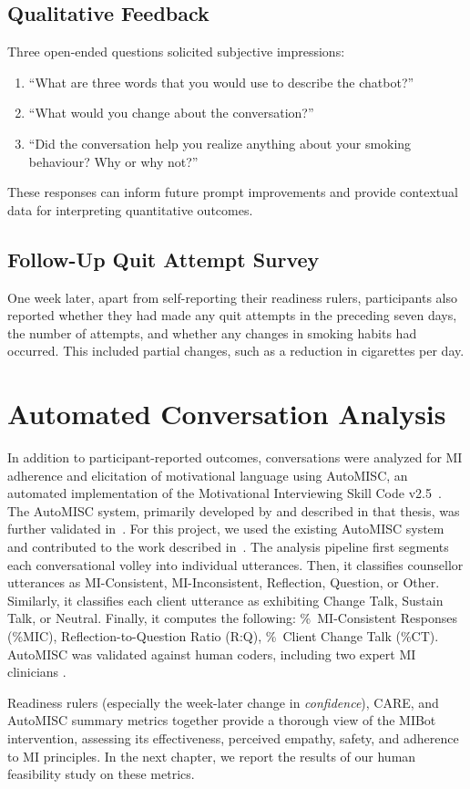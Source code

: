 \subsection{Qualitative Feedback}
Three open-ended questions solicited subjective impressions:
\begin{enumerate}
    \item ``What are three words that you would use to describe the chatbot?''
    \item ``What would you change about the conversation?''
    \item ``Did the conversation help you realize anything about your smoking behaviour? Why or why not?''
\end{enumerate}
These responses can inform future prompt improvements and provide contextual data for interpreting quantitative outcomes.

\subsection{Follow-Up Quit Attempt Survey}
One week later, apart from self-reporting their readiness rulers, participants also reported whether they had made any quit attempts in the preceding seven days, the number of attempts, and whether any changes in smoking habits had occurred. This included partial changes, such as a reduction in cigarettes per day.

\section{Automated Conversation Analysis}
\label{subsec:automisc}
In addition to participant-reported outcomes, conversations were analyzed for MI adherence and elicitation of motivational language using AutoMISC, an automated implementation of the Motivational Interviewing Skill Code v2.5~\citep{Houck2010}. The AutoMISC system, primarily developed by \citet{ali2025thesis} and described in that thesis, was further validated in~\citep{ali2025automated}. For this project, we used the existing AutoMISC system and contributed to the work described in~\citep{mahmood-etal-2025-fully}. The analysis pipeline first segments each conversational volley into individual utterances. Then, it classifies counsellor utterances as MI-Consistent, MI-Inconsistent, Reflection, Question, or Other. Similarly, it classifies each client utterance as exhibiting Change Talk, Sustain Talk, or Neutral. Finally, it computes the following: \%~MI-Consistent Responses (\%MIC), Reflection-to-Question Ratio (R:Q), \%~Client Change Talk (\%CT). AutoMISC was validated against human coders, including two expert MI clinicians \citep{mahmood-etal-2025-fully}.

Readiness rulers (especially the week-later change in \emph{confidence}), CARE, and AutoMISC summary metrics together provide a thorough view of the MIBot intervention, assessing its effectiveness, perceived empathy, safety, and adherence to MI principles. In the next chapter, we report the results of our human feasibility study on these metrics.
